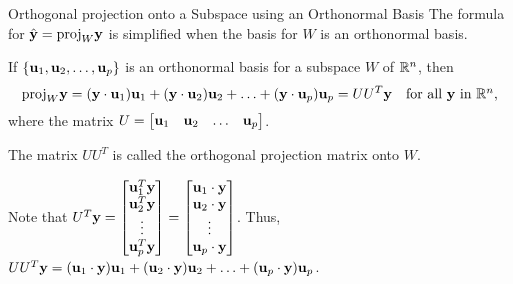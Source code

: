 \documentclass[xcolor=dvipsnames,aspectratio=169,t]{beamer}
\begin{document}
\begin{frame}{Orthogonal projection onto a Subspace using an Orthonormal Basis}
  The formula for $\hat{\mathbf{y}} = \mbox{proj}_W \mathbf{y}$ is simplified when the basis for $W$ is an \alert{orthonormal basis}.

  \begin{theorem}
  If $\left\{ \mathbf{u}_1,\mathbf{u}_2,\ldots,\mathbf{u}_p \right\}$ is an \alert{orthonormal basis} for a subspace $W$ of $\mathbb{R}^n$, then
  \[ \mbox{proj}_{W} \mathbf{y} = (\mathbf{y} \cdot \mathbf{u}_1) \mathbf{u}_1 + (\mathbf{y} \cdot \mathbf{u}_2) \mathbf{u}_2 + \ldots +  (\mathbf{y} \cdot \mathbf{u}_p) \mathbf{u}_p = UU^T\mathbf{y} \quad \mbox{for all $\mathbf{y}$ in $\mathbb{R}^n$,}\]
  where the matrix $U = \begin{bmatrix} \mathbf{u}_1 & \mathbf{u}_2 & \ldots & \mathbf{u}_p \end{bmatrix}$.
  \end{theorem}
  The matrix $UU^T$ is called the \alert{orthogonal projection matrix onto $W$}.
  \bigskip

  \pause
  
  Note that $U^T\mathbf{y} = 
  \begin{bmatrix} \mathbf{u}_1^T \mathbf{y} \\ \mathbf{u}_2^T \mathbf{y} \\ \vdots \\ \mathbf{u}_p^T \mathbf{y} \end{bmatrix} =
  \begin{bmatrix} \mathbf{u}_1 \cdot \mathbf{y} \\ \mathbf{u}_2 \cdot \mathbf{y} \\ \vdots \\ \mathbf{u}_p \cdot \mathbf{y} \end{bmatrix}$.
  Thus, $U U^T \mathbf{y}= (\mathbf{u}_1 \cdot \mathbf{y}) \mathbf{u}_1 + (\mathbf{u}_2 \cdot \mathbf{y}) \mathbf{u}_2 + \ldots +  (\mathbf{u}_p \cdot \mathbf{y}) \mathbf{u}_p$.
\end{frame}
\end{document}
